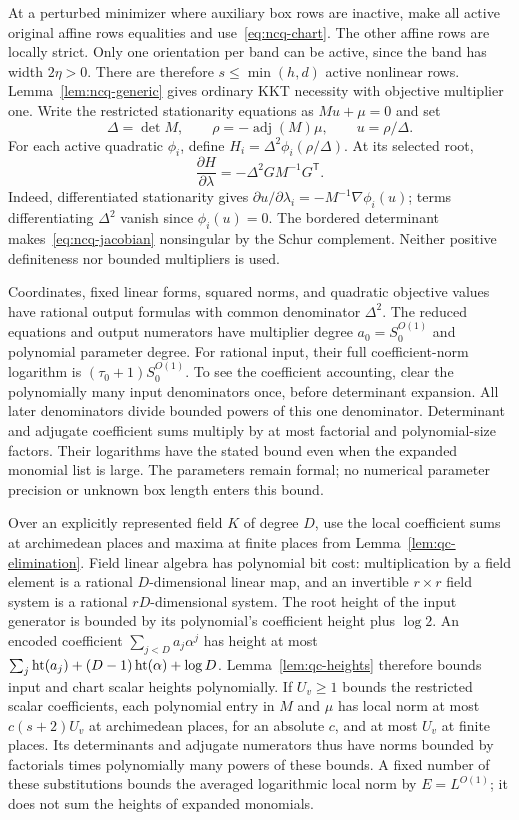 At a perturbed minimizer where auxiliary box rows are inactive, make all
active original affine rows equalities and use~\eqref{eq:ncq-chart}. The
other affine rows are locally strict. Only one orientation per band can be
active, since the band has width $2\eta>0$. There are therefore
$s\le\min(h,d)$ active nonlinear rows. Lemma~\ref{lem:ncq-generic}
gives ordinary KKT necessity with objective multiplier one. Write the
restricted stationarity equations as $Mu+\mu=0$ and set
\[
 \Delta=\det M,\qquad \rho=-\operatorname{adj}(M)\mu,
 \qquad u=\rho/\Delta.
\]
For each active quadratic $\phi_i$, define
$H_i=\Delta^2\phi_i(\rho/\Delta)$. At its selected root,
\begin{equation}
\label{eq:ncq-jacobian}
 \frac{\partial H}{\partial\lambda}
       =-\Delta^2GM^{-1}G^{\mathsf T}.
\end{equation}
Indeed, differentiated stationarity gives
$\partial u/\partial\lambda_i=-M^{-1}\nabla\phi_i(u)$; terms
differentiating $\Delta^2$ vanish since $\phi_i(u)=0$.
The bordered determinant makes~\eqref{eq:ncq-jacobian} nonsingular by
the Schur complement. Neither positive definiteness nor bounded multipliers
is used.

Coordinates, fixed linear forms, squared norms, and quadratic objective
values have rational output formulas with common denominator $\Delta^2$.
The reduced equations and output numerators have multiplier degree
$a_0=S_0^{O(1)}$ and polynomial parameter degree. For rational input,
their full coefficient-norm logarithm is
$(\tau_0+1)S_0^{O(1)}$. To see the coefficient accounting, clear the
polynomially many input denominators once, before determinant expansion.
All later denominators divide bounded powers of this one denominator.
Determinant and adjugate coefficient sums multiply by at most factorial
and polynomial-size factors. Their logarithms have the stated bound even
when the expanded monomial list is large. The parameters remain formal;
no numerical parameter precision or unknown box length enters this bound.

Over an explicitly represented field $K$ of degree $D$, use the local
coefficient sums at archimedean places and maxima at finite places from
Lemma~\ref{lem:qc-elimination}. Field linear algebra has polynomial bit
cost: multiplication by a field element is a rational $D$-dimensional
linear map, and an invertible $r\times r$ field system is a rational
$rD$-dimensional system. The root height of the input generator is
bounded by its polynomial's coefficient height plus $\log2$. An encoded
coefficient $\sum_{j<D}a_j\alpha^j$ has height at most
$\sum_j\operatorname{ht}(a_j)+(D-1)\operatorname{ht}(\alpha)+\log D$.
Lemma~\ref{lem:qc-heights} therefore bounds input and chart scalar
heights polynomially. If $U_v\ge1$ bounds the restricted scalar
coefficients, each polynomial entry in $M$ and $\mu$ has local norm at
most $c(s+2)U_v$ at archimedean places, for an absolute $c$, and at
most $U_v$ at finite places. Its determinants and adjugate numerators
thus have norms bounded by factorials times polynomially many powers
of these bounds. A fixed number of these substitutions bounds the
averaged logarithmic local norm by
$E=L^{O(1)}$; it does not sum the heights of expanded monomials.

